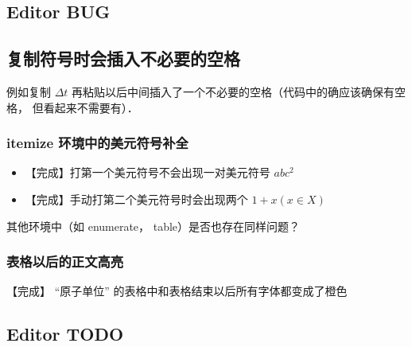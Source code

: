 
\subsection{Editor BUG}



\subsection{复制符号时会插入不必要的空格}
例如复制 $\Delta t$ 再粘贴以后中间插入了一个不必要的空格（代码中的确应该确保有空格， 但看起来不需要有）．

\subsubsection{itemize 环境中的美元符号补全}
\begin{itemize}
\item 【完成】打第一个美元符号不会出现一对美元符号 $abc^2$
\item 【完成】手动打第二个美元符号时会出现两个 $1 + x (x \in X)$
\end{itemize}
其他环境中（如 enumerate， table）是否也存在同样问题？

\subsubsection{表格以后的正文高亮}
【完成】 “原子单位” 的表格中和表格结束以后所有字体都变成了橙色

\subsection{Editor TODO}

